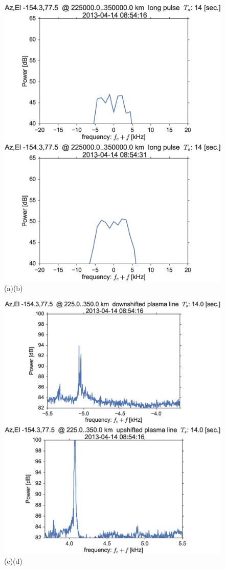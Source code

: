 \begin{figure}\noindent
	\includegraphics[width=0.425\columnwidth]{gfx/2013-04-14T0854/acfslice_longpulse2013-04-1408-54-16}
	\includegraphics[width=0.425\columnwidth]{gfx/2013-04-14T0854/acfslice_longpulse2013-04-1408-54-31}\\
	
	\vspace{-1.5cm}
	\hspace{0.0cm}(a)\hspace{0.4\columnwidth}(b)
	\vspace{0.3cm}
	
	\includegraphics[width=0.425\columnwidth,trim=0 50 0 0]{gfx/2013-04-14T0854/plasmaDOWNslice2013-04-1408-54-16}
	\includegraphics[width=0.425\columnwidth,trim=0 50 0 0]{gfx/2013-04-14T0854/plasmaUPslice2013-04-1408-54-16}\\
	
	\vspace{-1.2cm}
	\hspace{0.0cm}(c)\hspace{0.4\columnwidth}(d)
	\vspace{0.3cm}
	

\end{figure}
